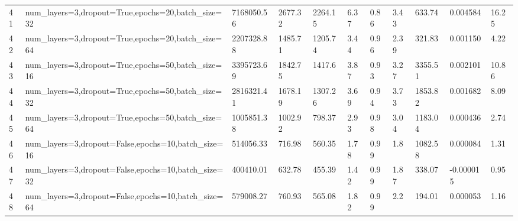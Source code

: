 \begin{longtable}{C{0.8cm} L{2cm} C{1.15cm} C{1.15cm} C{1.15cm} C{1.15cm} C{0.85cm} C{1.25cm} C{1.2cm} C{1.5cm} C{1.0cm}}
41 & num\_layers=3,\newline dropout=True,\newline epochs=20,\newline batch\_size=32 & 7168050.56 & 2677.32 & 2264.15 & 6.37 & 0.86 & 3.43 & 633.74 & 0.004584 & 16.25 \\
42 & num\_layers=3,\newline dropout=True,\newline epochs=20,\newline batch\_size=64 & 2207328.88 & 1485.71 & 1205.74 & 3.44 & 0.96 & 2.39 & 321.83 & 0.001150 & 4.22 \\
43 & num\_layers=3,\newline dropout=True,\newline epochs=50,\newline batch\_size=16 & 3395723.69 & 1842.75 & 1417.6 & 3.87 & 0.93 & 3.27 & 3355.51 & 0.002101 & 10.86 \\
44 & num\_layers=3,\newline dropout=True,\newline epochs=50,\newline batch\_size=32 & 2816321.41 & 1678.19 & 1307.26 & 3.69 & 0.94 & 3.73 & 1853.82 & 0.001682 & 8.09 \\
45 & num\_layers=3,\newline dropout=True,\newline epochs=50,\newline batch\_size=64 & 1005851.38 & 1002.92 & 798.37 & 2.93 & 0.98 & 3.04 & 1183.04 & 0.000436 & 2.74 \\
46 & num\_layers=3,\newline dropout=False,\newline epochs=10,\newline batch\_size=16 & 514056.33 & 716.98 & 560.35 & 1.78 & 0.99 & 1.8 & 1082.58 & 0.000084 & 1.31 \\
47 & num\_layers=3,\newline dropout=False,\newline epochs=10,\newline batch\_size=32 & 400410.01 & 632.78 & 455.39 & 1.42 & 0.99 & 1.87 & 338.07 & -0.000015 & 0.95 \\
48 & num\_layers=3,\newline dropout=False,\newline epochs=10,\newline batch\_size=64 & 579008.27 & 760.93 & 565.08 & 1.82 & 0.99 & 2.2 & 194.01 & 0.000053 & 1.16 \\

\end{longtable}
